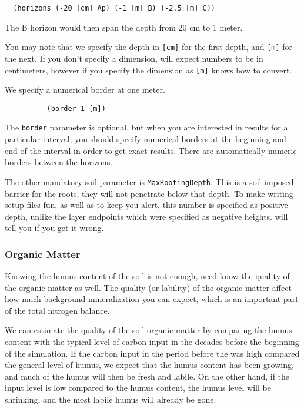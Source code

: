 \documentclass[a4paper,11pt]{article}
\begin{document}
\begin{verbatim}
  (horizons (-20 [cm] Ap) (-1 [m] B) (-2.5 [m] C))
\end{verbatim}

The B horizon would then span the depth from 20 cm to 1
meter.

You may note that we specify the depth in \verb|[cm]| for the first
depth, and \verb|[m]| for the next.  If you don't specify a dimension,
\daisy{} will expect numbers to be in centimeters, however if you
specify the dimension as \verb|[m]| knows how to convert.  

We specify a numerical border at one meter.
\begin{verbatim}
          (border 1 [m])
\end{verbatim}
The \texttt{border} parameter is optional, but when you are interested
in results for a particular interval, you should specify numerical
borders at the beginning and end of the interval in order to get exact
results.  There are automatically numeric borders between the horizons.

The other mandatory soil parameter is \texttt{MaxRootingDepth}.  This
is a soil imposed barrier for the roots, they will not penetrate below
that depth.  To make writing \daisy{} setup files fun, as well as to
keep you alert, this number is specified as positive depth, unlike the
layer endpoints which were specified as negative heights.  \Daisy{}
will tell you if you get it wrong.

\subsubsection{Organic Matter}
\label{ex:om}

Knowing the humus content of the soil is not enough, \daisy{} need know
the quality of the organic matter as well.  The quality (or lability)
of the organic matter affect how much background mineralization you
can expect, which is an important part of the total nitrogen balance.

We can estimate the quality of the soil organic matter by comparing
the humus content with the typical level of carbon input in the
decades before the beginning of the simulation.  If the carbon input
in the period before the was high compared the general level of humus,
we expect that the humus content has been growing, and much of the
humus will then be fresh and labile.  On the other hand, if the input
level is low compared to the humus content, the humus level will be
shrinking, and the most labile humus will already be gone.
\end{document}
